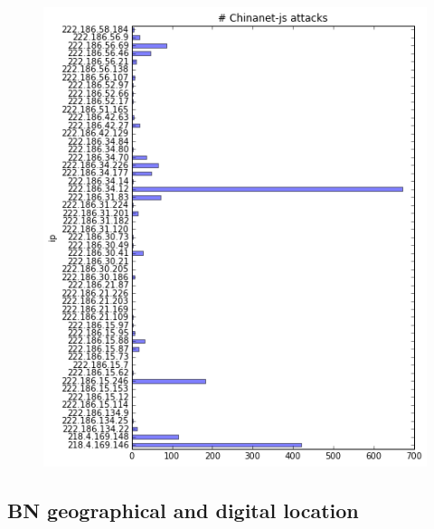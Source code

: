 \begin{figure}[h]
    \centering
    \includegraphics[width=\linewidth]{cn-js}
\end{figure}
\subsection{BN geographical and digital location}
